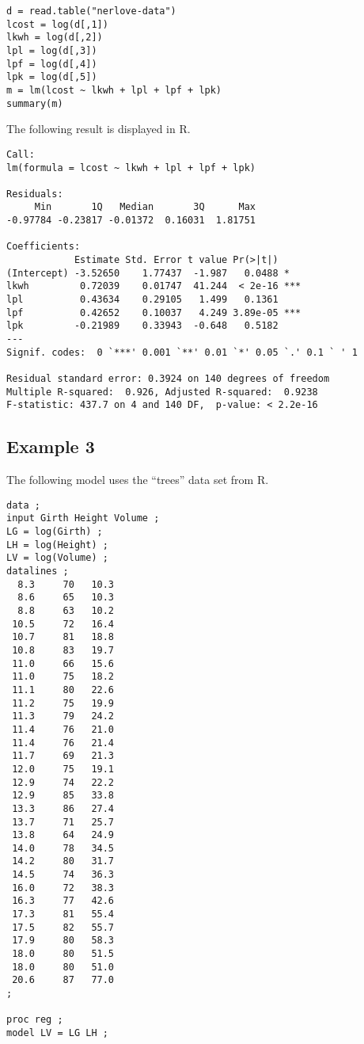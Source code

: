 \documentclass[12pt]{article}
\begin{document}
{\scriptsize\begin{verbatim}
d = read.table("nerlove-data")
lcost = log(d[,1])
lkwh = log(d[,2])
lpl = log(d[,3])
lpf = log(d[,4])
lpk = log(d[,5])
m = lm(lcost ~ lkwh + lpl + lpf + lpk)
summary(m)
\end{verbatim}}

The following result is displayed in R.

{\scriptsize\begin{verbatim}
Call:
lm(formula = lcost ~ lkwh + lpl + lpf + lpk)

Residuals:
     Min       1Q   Median       3Q      Max 
-0.97784 -0.23817 -0.01372  0.16031  1.81751 

Coefficients:
            Estimate Std. Error t value Pr(>|t|)    
(Intercept) -3.52650    1.77437  -1.987   0.0488 *  
lkwh         0.72039    0.01747  41.244  < 2e-16 ***
lpl          0.43634    0.29105   1.499   0.1361    
lpf          0.42652    0.10037   4.249 3.89e-05 ***
lpk         -0.21989    0.33943  -0.648   0.5182    
---
Signif. codes:  0 `***' 0.001 `**' 0.01 `*' 0.05 `.' 0.1 ` ' 1

Residual standard error: 0.3924 on 140 degrees of freedom
Multiple R-squared:  0.926,	Adjusted R-squared:  0.9238 
F-statistic: 437.7 on 4 and 140 DF,  p-value: < 2.2e-16
\end{verbatim}}

\subsection*{Example 3}

The following model uses the ``trees'' data set from R.

{\scriptsize\begin{verbatim}
data ;
input Girth Height Volume ;
LG = log(Girth) ;
LH = log(Height) ;
LV = log(Volume) ;
datalines ;
  8.3     70   10.3
  8.6     65   10.3
  8.8     63   10.2
 10.5     72   16.4
 10.7     81   18.8
 10.8     83   19.7
 11.0     66   15.6
 11.0     75   18.2
 11.1     80   22.6
 11.2     75   19.9
 11.3     79   24.2
 11.4     76   21.0
 11.4     76   21.4
 11.7     69   21.3
 12.0     75   19.1
 12.9     74   22.2
 12.9     85   33.8
 13.3     86   27.4
 13.7     71   25.7
 13.8     64   24.9
 14.0     78   34.5
 14.2     80   31.7
 14.5     74   36.3
 16.0     72   38.3
 16.3     77   42.6
 17.3     81   55.4
 17.5     82   55.7
 17.9     80   58.3
 18.0     80   51.5
 18.0     80   51.0
 20.6     87   77.0
;

proc reg ;
model LV = LG LH ;
\end{verbatim}}
\end{document}
